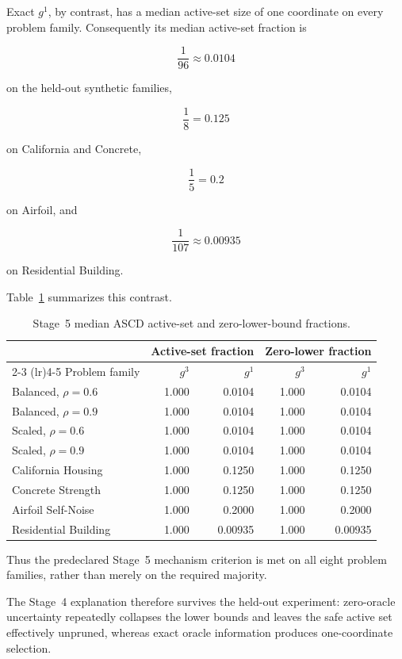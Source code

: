 \documentclass[11pt]{article}
\begin{document}
Exact $g^1$, by contrast, has a median active-set size of one coordinate
on every problem family. Consequently its median active-set fraction is

\[
\frac{1}{96}\approx0.0104
\]

on the held-out synthetic families,

\[
\frac18=0.125
\]

on California and Concrete,

\[
\frac15=0.2
\]

on Airfoil, and

\[
\frac1{107}\approx0.00935
\]

on Residential Building.

Table~\ref{tab:stage5-mechanism} summarizes this contrast.

\begin{table}[!htbp]
\centering
\caption{
Stage~5 median ASCD active-set and zero-lower-bound fractions.
}
\label{tab:stage5-mechanism}
\small
\begin{tabular}{lrrrr}
\toprule
& \multicolumn{2}{c}{Active-set fraction}
& \multicolumn{2}{c}{Zero-lower fraction} \\
\cmidrule(lr){2-3}
\cmidrule(lr){4-5}
Problem family
& $g^3$
& $g^1$
& $g^3$
& $g^1$ \\
\midrule
Balanced, $\rho=0.6$ & 1.000 & 0.0104 & 1.000 & 0.0104 \\
Balanced, $\rho=0.9$ & 1.000 & 0.0104 & 1.000 & 0.0104 \\
Scaled, $\rho=0.6$   & 1.000 & 0.0104 & 1.000 & 0.0104 \\
Scaled, $\rho=0.9$   & 1.000 & 0.0104 & 1.000 & 0.0104 \\
California Housing   & 1.000 & 0.1250 & 1.000 & 0.1250 \\
Concrete Strength    & 1.000 & 0.1250 & 1.000 & 0.1250 \\
Airfoil Self-Noise   & 1.000 & 0.2000 & 1.000 & 0.2000 \\
Residential Building & 1.000 & 0.00935& 1.000 & 0.00935\\
\bottomrule
\end{tabular}
\end{table}

Thus the predeclared Stage~5 mechanism criterion is met on all eight
problem families, rather than merely on the required majority.

The Stage~4 explanation therefore survives the held-out experiment:
zero-oracle uncertainty repeatedly collapses the lower bounds and leaves
the safe active set effectively unpruned, whereas exact oracle
information produces one-coordinate selection.
\end{document}
